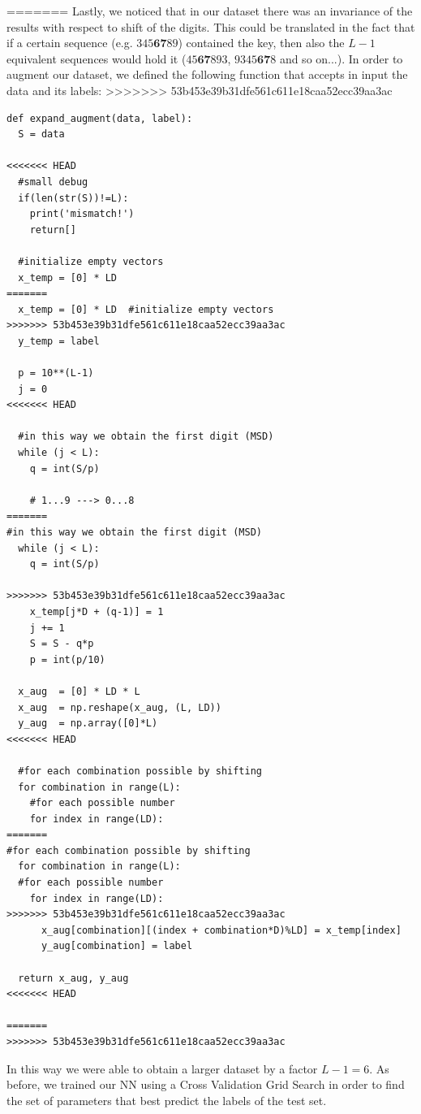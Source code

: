 \documentclass[prl,twocolumn]{revtex4-1}
\begin{document}
=======
Lastly, we noticed that in our dataset there was an invariance of the results with respect to shift of the digits. This could be translated in the fact that if a certain sequence (e.g. $345\textbf{67}89$) contained the key, then also the $L-1$ equivalent sequences would hold it ($45\textbf{67}893$, $9345\textbf{67}8$ and so on...). In order to augment our dataset, we defined the following function that accepts in input the data and its labels:
>>>>>>> 53b453e39b31dfe561c611e18caa52ecc39aa3ac
\begin{verbatim}
def expand_augment(data, label):
  S = data

<<<<<<< HEAD
  #small debug 
  if(len(str(S))!=L):
    print('mismatch!')
    return[]
    
  #initialize empty vectors
  x_temp = [0] * LD
=======
  x_temp = [0] * LD  #initialize empty vectors
>>>>>>> 53b453e39b31dfe561c611e18caa52ecc39aa3ac
  y_temp = label

  p = 10**(L-1)
  j = 0
<<<<<<< HEAD

  #in this way we obtain the first digit (MSD)
  while (j < L):
    q = int(S/p)

    # 1...9 ---> 0...8
=======
#in this way we obtain the first digit (MSD)
  while (j < L):  
    q = int(S/p)

>>>>>>> 53b453e39b31dfe561c611e18caa52ecc39aa3ac
    x_temp[j*D + (q-1)] = 1
    j += 1
    S = S - q*p
    p = int(p/10)

  x_aug  = [0] * LD * L
  x_aug  = np.reshape(x_aug, (L, LD))
  y_aug  = np.array([0]*L)
<<<<<<< HEAD

  #for each combination possible by shifting
  for combination in range(L):
    #for each possible number 
    for index in range(LD):
=======
#for each combination possible by shifting
  for combination in range(L): 
  #for each possible number 
    for index in range(LD): 
>>>>>>> 53b453e39b31dfe561c611e18caa52ecc39aa3ac
      x_aug[combination][(index + combination*D)%LD] = x_temp[index]
      y_aug[combination] = label 

  return x_aug, y_aug
<<<<<<< HEAD

=======
>>>>>>> 53b453e39b31dfe561c611e18caa52ecc39aa3ac
\end{verbatim}

In this way we were able to obtain a larger dataset by a factor $L-1 = 6$. As before, we trained our NN using a Cross Validation Grid Search in order to find the set of parameters that best predict the labels of the test set.
\end{document}
